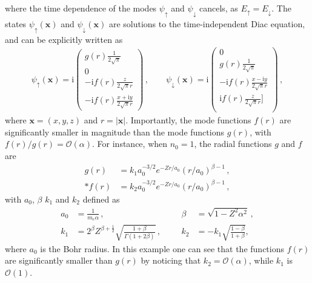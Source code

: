 \documentclass[letterpaper,12pt,titlepage,oneside,final]{book}
\newcommand{\ii}{\mathrm{i}}
\begin{document}
where the time dependence of the modes $\psi_{\uparrow}$ and $\psi_{\downarrow}$ cancels, as $E_\uparrow = E_\downarrow$. 
The states $\psi_\uparrow(\bm x)$ and $\psi_\downarrow(\bm x)$ are solutions to the time-independent Diac equation, and can be explicitly written as
\begin{align}
    \psi_\uparrow(\bm x) = \ii\begin{pmatrix}
    g(r)\frac{1}{2\sqrt{\pi}}\\
    0\\
    -\ii f(r)\frac{z}{2\sqrt{\pi}r}\\
    -\ii f(r)\frac{x+\ii y}{2\sqrt{\pi}r}
\end{pmatrix} \, ,\label{Psi-lzero-up}\quad\quad
    \psi_\downarrow(\bm x) = \ii\begin{pmatrix}
    0\\
    g(r)\frac{1}{2\sqrt{\pi}}\\
    -\ii f(r)\frac{x-\ii y}{2\sqrt{\pi}r}\\
    \ii f(r)\frac{z}{2\sqrt{\pi}r}]\\
\end{pmatrix} \, ,
\end{align}
where $\bm x = (x,y,z)$ and $r = |\bm x|$. Importantly, the mode functions $f(r)$ are significantly smaller in magnitude than the mode functions $g(r)$, with $f(r)/g(r) = \mathcal{O}(\alpha)$. For instance, when $n_0 = 1$, the radial functions $g$ and $f$ are
\begin{align}
    g(r) &= k_1a_0^{-3/2}e^{-Z r/a_0}(r/a_0)^{\beta-1}\label{g} \, ,\\*
    f(r) &= k_2a_0^{-3/2}e^{-Z r/a_0}(r/a_0)^{\beta-1}\label{f}\, ,
\end{align}
with $a_0$, $\beta$ $k_1$ and $k_2$ defined as
\begin{align}
    a_0 &= \frac{1}{m_e\alpha}\, , 
  &&&  \beta &= \sqrt{1 - Z^2\alpha^2}\label{a0beta} \, ,\\
    k_1 &= 2^\beta Z^{\beta + \tfrac{1}{2}} \sqrt{\frac{1+\beta}{\Gamma(1+2\beta)}} \, ,  &&&
    k_2 &= -k_1\sqrt{\frac{1-\beta}{1+\beta}},\label{k1k2}%
\end{align}
 where $a_0$ is the Bohr radius. In this example one can see that the functions $f(r)$ are significantly smaller than $g(r)$ by noticing that  $k_2 = \mathcal{O}(\alpha)$, while $k_1$ is  $\mathcal{O}(1)$.
\end{document}
